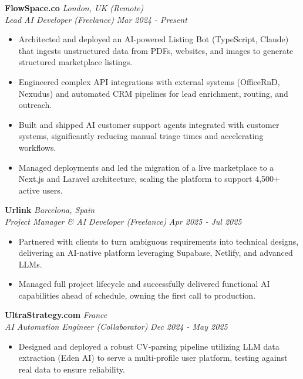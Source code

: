\documentclass[11pt,a4paper]{article}
\begin{document}
\noindent
\textbf{FlowSpace.co} \hfill \textit{London, UK (Remote)} \\
\textit{Lead AI Developer (Freelance)} \hfill \textit{Mar 2024 - Present}
\begin{itemize}[leftmargin=*,noitemsep]
    \item Architected and deployed an AI-powered Listing Bot (TypeScript, Claude) that ingests unstructured data from PDFs, websites, and images to generate structured marketplace listings.
    \item Engineered complex API integrations with external systems (OfficeRnD, Nexudus) and automated CRM pipelines for lead enrichment, routing, and outreach.
    \item Built and shipped AI customer support agents integrated with customer systems, significantly reducing manual triage times and accelerating workflows.
    \item Managed deployments and led the migration of a live marketplace to a Next.js and Laravel architecture, scaling the platform to support 4,500+ active users.
\end{itemize}

\vspace{1ex}
\noindent
\textbf{Urlink} \hfill \textit{Barcelona, Spain} \\
\textit{Project Manager \& AI Developer (Freelance)} \hfill \textit{Apr 2025 - Jul 2025}
\begin{itemize}[leftmargin=*,noitemsep]
    \item Partnered with clients to turn ambiguous requirements into technical designs, delivering an AI-native platform leveraging Supabase, Netlify, and advanced LLMs.
    \item Managed full project lifecycle and successfully delivered functional AI capabilities ahead of schedule, owning the first call to production.
\end{itemize}

\vspace{1ex}
\noindent
\textbf{UltraStrategy.com} \hfill \textit{France} \\
\textit{AI Automation Engineer (Collaborator)} \hfill \textit{Dec 2024 - May 2025}
\begin{itemize}[leftmargin=*,noitemsep]
    \item Designed and deployed a robust CV-parsing pipeline utilizing LLM data extraction (Eden AI) to serve a multi-profile user platform, testing against real data to ensure reliability.
\end{itemize}
\end{document}
